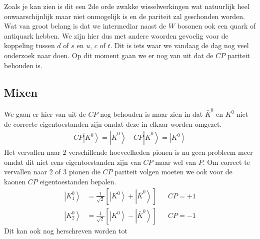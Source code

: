 \documentclass[../main.tex]{subfiles}
\begin{document}
Zoals je kan zien is dit een 2de orde zwakke wisselwerkingen wat natuurlijk heel onwaarschijnlijk maar niet onmogelijk is en de pariteit zal geschonden worden. Wat van groot belang is dat we intermediar naast de $W$ bosonen ook een quark of antiquark hebben. We zijn hier dus met andere woorden gevoelig voor de koppeling tussen $d$ of $s$ en $u$, $c$ of $t$. Dit is iets waar we vandaag de dag nog veel onderzoek naar doen. Op dit moment gaan we er nog van uit dat de $CP$ pariteit behouden is.

\subsection{Mixen}%
\label{sub:mixen}

We gaan er hier van uit de $CP$ nog behouden is maar zien in dat $\bar{K}^{0}$ en $K^{0}$ niet de correcte eigentoestanden zijn omdat deze in elkaar worden omgezet.
\begin{equation}
    \begin{aligned}
        \label{eq:cp_anti_kaon}
        C P\left|K^{0}\right>=\left| \bar{K}^{0}\right>\quad C P\left|\bar{K}^{0}\right>=\left| K^{0}\right>
    \end{aligned}
\end{equation}
Het vervallen naar 2 verschillende hoeveelheden pionen is nu geen probleem meer omdat dit niet eens eigentoestanden zijn van $CP$ maar wel van $P$. Om correct te vervallen naar 2 of 3 pionen die $CP$ pariteit volgen moeten we ook voor de kaonen $CP$ eigentoestanden bepalen.
\begin{equation}
    \begin{aligned}
        \label{eq:kaon_cp_eigentoestanden}
        \left| K_{1}^{0}\right>&=\frac{1}{\sqrt{2}}\left[\left|K^{0}\right>+\left| \bar{K}^{0}\right>\right] & & C P=+1 \\
        \left| K_{2}^{0}\right>&=\frac{1}{\sqrt{2}}\left[\left|K^{0}\right>-\left| \bar{K}^{0}\right>\right] & & C P=-1
    \end{aligned}
\end{equation}
Dit kan ook nog herschreven worden tot
\end{document}
